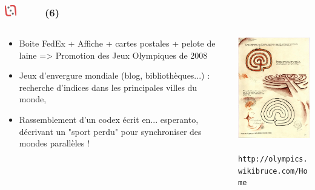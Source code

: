 \documentclass[slidetop,11pt]{beamer}
\def\moreInFrameTitleLeftt{\includegraphics[height=0.5cm]{img/ligueludique-0.png}~~~~~}
\begin{document}
\begin{frame}
	\frametitle{\moreInFrameTitleLeftt \sectionPartIIaIV  (6) }
	\begin{columns}[T]
		\begin{column}[T]{5.05cm}
			\begin{itemize}
				\item Boite FedEx + Affiche + cartes postales + pelote de laine => Promotion des Jeux Olympiques de 2008
				\item Jeux d'envergure mondiale (blog, biblioth{\`e}ques...) : recherche d'indices dans les principales villes du monde, 
				\item Rassemblement d'un codex {\'e}crit en... esperanto, d{\'e}crivant un "sport perdu" pour synchroniser des mondes parall{\`e}les !
			\end{itemize}
		\end{column}
		\begin{column}[T]{5.05cm}
			\includegraphics[width=5.00cm]{img/argTheLostRing/430px-CotLR-4Ap2.jpg}~\\
			\texttt{\footnotesize http://olympics.wikibruce.com/Home}
		\end{column}
	\end{columns}
\end{frame}

\def\sectionPartIIaV{Majestic}
\end{document}
